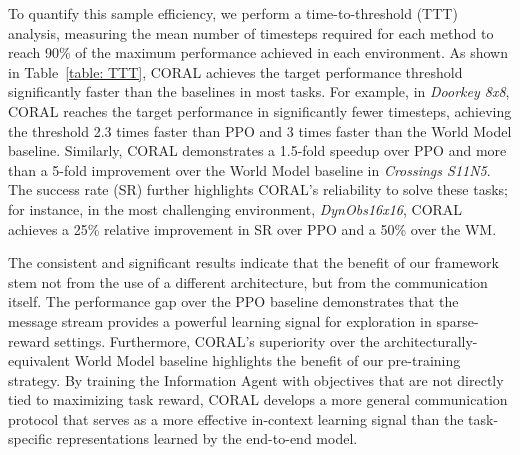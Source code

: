\documentclass[letterpaper]{article} %
\begin{document}
To quantify this sample efficiency, we perform a time-to-threshold (TTT) analysis, measuring the mean number of timesteps required for each method to reach 90\% of the maximum performance achieved in each environment. As shown in Table~\ref{table: TTT}, CORAL achieves the target performance threshold significantly faster than the baselines in most tasks. For example, in \textit{Doorkey 8x8}, CORAL reaches the target performance in significantly fewer timesteps, achieving the threshold 2.3 times faster than PPO and 3 times faster than the World Model baseline. Similarly, CORAL demonstrates a 1.5-fold speedup over PPO and more than a 5-fold improvement over the World Model baseline in \textit{Crossings S11N5}. The success rate (SR) further highlights CORAL's reliability to solve these tasks; for instance, in the most challenging environment, \textit{DynObs16x16}, CORAL achieves a 25\% relative improvement in SR over PPO and a 50\% over the WM.

The consistent and significant results indicate that the benefit of our framework stem not from the use of a different architecture, but from the communication itself. The performance gap over the PPO baseline demonstrates that the message stream provides a powerful learning signal for exploration in sparse-reward settings. Furthermore, CORAL's superiority over the architecturally-equivalent World Model baseline highlights the benefit of our pre-training strategy. By training the Information Agent with objectives that are not directly tied to maximizing task reward, CORAL develops a more general communication protocol that serves as a more effective in-context learning signal than the task-specific representations learned by the end-to-end model.


\end{document}
